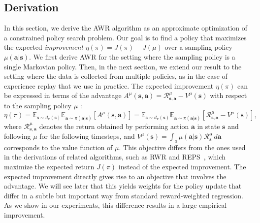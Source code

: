 \documentclass{article} \usepackage{iclr2020_conference,times}
\def\rva{{\mathbf{a}}}
\def\rvs{{\mathbf{s}}}
\newcommand{\expec}{\mathbb{E}}
\begin{document}
\subsection{Derivation}
In this section, we derive the AWR algorithm as an approximate optimization of a constrained policy search problem. Our goal is to find a policy that maximizes the expected \emph{improvement} ${\eta(\pi) = J(\pi) - J(\mu)}$ over a sampling policy $\mu(\rva | \rvs)$. We first derive AWR for the setting where the sampling policy is a single Markovian policy. Then, in the next section, we extend our result to the setting where the data is collected from multiple policies, as in the case of experience replay that we use in practice. The expected improvement $\eta(\pi)$ can be expressed in terms of the advantage $A^\mu(\rvs, \rva) = \mathcal{R}_{\rvs,\rva}^\mu - V^\mu(\rvs)$ with respect to the sampling policy $\mu$ \citep{Kakade2002,TRPOschulman15}:
\begin{equation}
    \eta(\pi) = \expec_{\rvs \sim d_\pi(\rvs)} \expec_{\rva \sim \pi(\rva|\rvs)} \left[A^\mu(\rvs, \rva) \right] = \expec_{\rvs \sim d_\pi(\rvs)} \expec_{\rva \sim \pi(\rva | \rvs)} \left[\mathcal{R}_{\rvs,\rva}^\mu - V^\mu(\rvs)\right], \label{eqn:Improvement}
\end{equation}
where $\mathcal{R}_{\rvs,\rva}^\mu$ denotes the return obtained by performing action $\rva$ in state $\rvs$ and following $\mu$ for the following timesteps, and $V^\mu(\rvs) = \int_a \mu(\rva | \rvs) \mathcal{R}_\rvs^\rva \ d\rva$ corresponds to the value function of $\mu$. 
This objective differs from the ones used in the derivations of related algorithms, such as RWR and REPS~\citep{Peters2007RWR,Peters2010REP,abdolmaleki2018maximum}, which maximize the expected return $J(\pi)$ instead of the expected improvement. The expected improvement directly gives rise to an objective that involves the advantage. We will see later that this yields weights for the policy update that differ in a subtle but important way from standard reward-weighted regression. As we show in our experiments, this difference results in a large empirical improvement.
\end{document}
